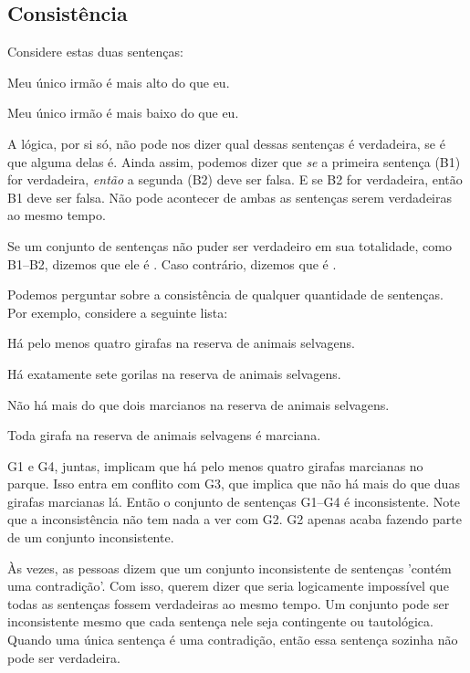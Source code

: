 \subsection{Consistência}
Considere estas duas sentenças:
\begin{ekey}
\item[B1] Meu único irmão é mais alto do que eu.
\item[B2] Meu único irmão é mais baixo do que eu.
\end{ekey}
A lógica, por si só, não pode nos dizer qual dessas sentenças é verdadeira, se é que alguma delas é. Ainda assim, podemos dizer que \emph{se} a primeira sentença (B1) for verdadeira, \emph{então} a segunda (B2) deve ser falsa. E se B2 for verdadeira, então B1 deve ser falsa. Não pode acontecer de ambas as sentenças serem verdadeiras ao mesmo tempo.

Se um conjunto de sentenças não puder ser verdadeiro em sua totalidade, como B1--B2, dizemos que ele é . Caso contrário, dizemos que é .

Podemos perguntar sobre a consistência de qualquer quantidade de sentenças. Por exemplo, considere a seguinte lista:
\label{MartianGiraffes}
\begin{ekey}
\item[G1] Há pelo menos quatro girafas na reserva de animais selvagens.
\item[G2] Há exatamente sete gorilas na reserva de animais selvagens.
\item[G3] Não há mais do que dois marcianos na reserva de animais selvagens.
\item[G4] Toda girafa na reserva de animais selvagens é marciana.
\end{ekey}
G1 e G4, juntas, implicam que há pelo menos quatro girafas marcianas no parque. Isso entra em conflito com G3, que implica que não há mais do que duas girafas marcianas lá. Então o conjunto de sentenças G1--G4 é inconsistente. Note que a inconsistência não tem nada a ver com G2. G2 apenas acaba fazendo parte de um conjunto inconsistente.

Às vezes, as pessoas dizem que um conjunto inconsistente de sentenças 'contém uma contradição'. Com isso, querem dizer que seria logicamente impossível que todas as sentenças fossem verdadeiras ao mesmo tempo. Um conjunto pode ser inconsistente mesmo que cada sentença nele seja contingente ou tautológica. Quando uma única sentença é uma contradição, então essa sentença sozinha não pode ser verdadeira.

